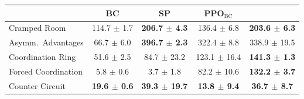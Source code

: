 \begin{tabular}{lcccc}
\toprule
 & BC & SP & PPO$_{\mathrm{BC}}$ & \facet{} \\
\midrule
Cramped Room & 114.7 $\pm$ 1.7 & \textbf{206.7 $\pm$ 4.3} & 136.4 $\pm$ 6.8 & \textbf{203.6 $\pm$ 6.3} \\
Asymm.\ Advantages & 66.7 $\pm$ 6.0 & \textbf{396.7 $\pm$ 2.3} & 322.4 $\pm$ 8.8 & 338.9 $\pm$ 19.5 \\
Coordination Ring & 51.6 $\pm$ 2.5 & 84.7 $\pm$ 23.2 & 123.1 $\pm$ 16.4 & \textbf{141.3 $\pm$ 1.3} \\
Forced Coordination & 5.8 $\pm$ 0.6 & 3.7 $\pm$ 1.8 & 82.2 $\pm$ 10.6 & \textbf{132.2 $\pm$ 3.7} \\
Counter Circuit & \textbf{19.6 $\pm$ 0.6} & \textbf{39.3 $\pm$ 19.7} & \textbf{13.8 $\pm$ 9.4} & \textbf{36.7 $\pm$ 8.7} \\
\bottomrule
\end{tabular}